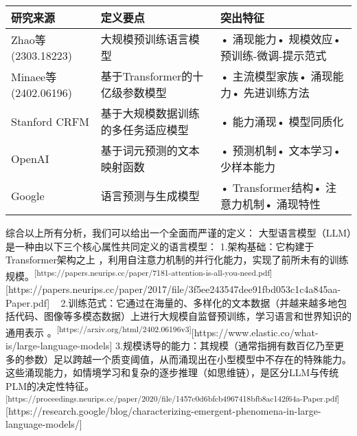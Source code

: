 \documentclass[
  letterpaper,
]{scrbook}
\begin{document}
\begin{longtable}[]{@{}
  >{\raggedright\arraybackslash}p{}
  >{\raggedright\arraybackslash}p{}
  >{\raggedright\arraybackslash}p{}@{}}
\toprule\noalign{}
\begin{minipage}[b]{\linewidth}\raggedright
研究来源
\end{minipage} & \begin{minipage}[b]{\linewidth}\raggedright
定义要点
\end{minipage} & \begin{minipage}[b]{\linewidth}\raggedright
突出特征
\end{minipage} \\
\midrule\noalign{}
\endhead
\bottomrule\noalign{}
\endlastfoot
Zhao等(2303.18223) & 大规模预训练语言模型 & • 涌现能力• 规模效应•
预训练-微调-提示范式 \\
Minaee等(2402.06196) & 基于Transformer的十亿级参数模型 & • 主流模型家族•
涌现能力• 先进训练方法 \\
Stanford CRFM & 基于大规模数据训练的多任务适应模型 & • 能力涌现•
模型同质化 \\
OpenAI & 基于词元预测的文本映射函数 & • 预测机制• 文本学习•
少样本能力 \\
Google & 语言预测与生成模型 & • Transformer结构• 注意力机制• 涌现特性 \\
\end{longtable}

综合以上所有分析，我们可以给出一个全面而严谨的定义：
大型语言模型（LLM）是一种由以下三个核心属性共同定义的语言模型：
1.架构基础：它构建于Transformer架构之上
，利用自注意力机制的并行化能力，实现了前所未有的训练规模。\textsuperscript{{[}https://papers.neurips.cc/paper/7181-attention-is-all-you-need.pdf{]}}{[}https://papers.neurips.cc/paper/2017/file/3f5ee243547dee91fbd053c1c4a845aa-Paper.pdf{]}
~
2.训练范式：它通过在海量的、多样化的文本数据（并越来越多地包括代码、图像等多模态数据）上进行大规模自监督预训练，学习语言和世界知识的通用表示
。\textsuperscript{{[}https://arxiv.org/html/2402.06196v3{]}}{[}https://www.elastic.co/what-is/large-language-models{]}
3.规模诱导的能力：其规模（通常指拥有数百亿乃至更多的参数）足以跨越一个质变阈值，从而涌现出在小型模型中不存在的特殊能力。这些涌现能力，如情境学习和复杂的逐步推理（如思维链），是区分LLM与传统PLM的决定性特征。\textsuperscript{{[}https://proceedings.neurips.cc/paper/2020/file/1457c0d6bfcb4967418bfb8ac142f64a-Paper.pdf{]}}{[}https://research.google/blog/characterizing-emergent-phenomena-in-large-language-models/{]}
\end{document}
